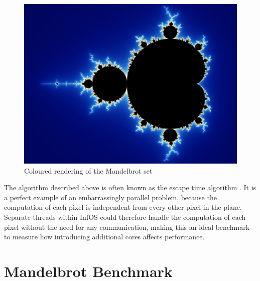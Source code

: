 \documentclass[bsc,frontabs,singlespacing,parskip,deptreport]{infthesis}     %
\begin{document}
\begin{figure}[h]
    \centering
    \includegraphics[scale=0.7]{mandelbrot.jpg}
    \caption{Coloured rendering of the Mandelbrot set \cite{mandelbrot-set}}
    \label{mandelbrot-vis}
\end{figure}

The algorithm described above is often known as the escape time algorithm \cite{mandelbrot-plotting-algorithms}. It is a perfect example of an embarrassingly parallel problem, because the computation of each pixel is independent from every other pixel in the plane. Separate threads within InfOS could therefore handle the computation of each pixel without the need for any communication, making this an ideal benchmark to measure how introducing additional cores affects performance.

\section{Mandelbrot Benchmark} \label{mb-benchmark}
\end{document}
